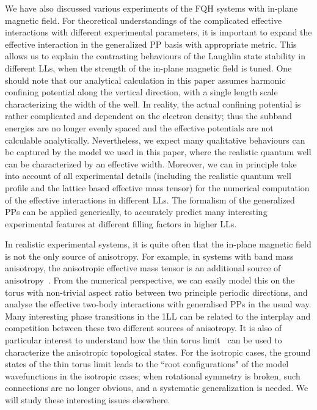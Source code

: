 \documentclass[twocolumn,showpacs,amsmath,amstex,amssymb,mathfonts,prb]{revtex4-1}
\begin{document}
We have also discussed various experiments of the FQH systems with in-plane magnetic field. For theoretical understandings of the complicated effective interactions with different experimental parameters, it is important to expand the effective interaction in the generalized PP basis with appropriate metric. This allows us to explain the contrasting behaviours of the Laughlin state stability in different LLs, when the strength of the in-plane magnetic field is tuned. One should note that our analytical calculation in this paper assumes harmonic confining potential along the vertical direction, with a single length scale characterizing the width of the well. In reality, the actual confining potential is rather complicated and dependent on the electron density; thus the subband energies are no longer evenly spaced and the effective potentials are not calculable analytically. Nevertheless, we expect many qualitative behaviours can be captured by the model we used in this paper, where the realistic quantum well can be characterized by an effective width\cite{zlatko}. Moreover, we can in principle take into account of all experimental details (including the realistic quantum well profile and the lattice based effective mass tensor) for the numerical computation of the effective interactions in different LLs. The formalism of the generalized PPs can be applied generically, to accurately predict many interesting experimental features at different filling factors in higher LLs.

In realistic experimental systems, it is quite often that the in-plane magnetic field is not the only source of anisotropy. For example, in systems with band mass anisotropy, the anisotropic effective mass tensor is an additional source of anisotropy~\cite{yang1}. From the numerical perspective, we can easily model this on the torus with non-trivial aspect ratio between two principle periodic directions, and analyse the effective two-body interactions with generalised PPs in the usual way. Many interesting phase transitions in the 1LL can be related to the interplay and competition between these two different sources of anisotropy. It is also of particular interest to understand how the thin torus limit~\cite{Tao, Rezayi94, Bergholtz} can be used to characterize the anisotropic topological states. For the isotropic cases, the ground states of the thin torus limit leads to the ``root configurations" of the model wavefunctions in the isotropic cases; when rotational symmetry is broken, such connections are no longer obvious, and a systematic generalization is needed. We will study these interesting issues elsewhere.
\end{document}
